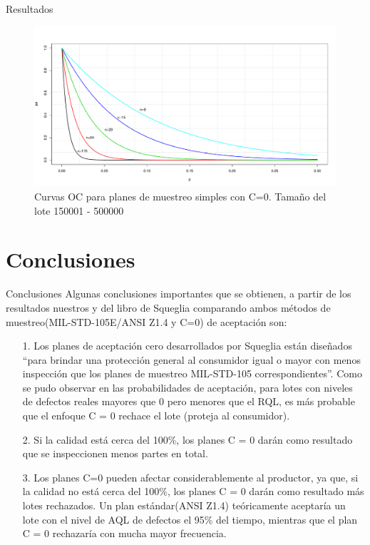\documentclass[10pt]{beamer}
\begin{document}
\begin{frame}{Resultados}
\begin{figure}[h!]
  \centering
  \includegraphics[scale=0.33]{FigurasUV/CO14.pdf}
  \caption{Curvas OC para planes de muestreo simples con C=0. Tamaño del lote 150001 - 500000}
\end{figure}
\end{frame}


\section{Conclusiones}
\begin{frame}{Conclusiones}
Algunas conclusiones importantes que se obtienen, a partir de los resultados nuestros y del libro de Squeglia comparando ambos métodos de muestreo(MIL-STD-105E/ANSI Z1.4 y C=0) de aceptación son:
\begin{itemize}
\justifying
\item[1.]Los planes de aceptación cero desarrollados por Squeglia están diseñados ``para brindar una protección general al consumidor igual o mayor con menos inspección que los planes de muestreo MIL-STD-105 correspondientes''. Como se pudo observar en las probabilidades de aceptación, para lotes con niveles de defectos reales mayores que 0 pero menores que el RQL, es más probable que el enfoque C = 0 rechace el lote (proteja al consumidor).

\item[2.]Si la calidad está cerca del 100\%, los planes C = 0 darán como resultado que se inspeccionen menos partes en total.

\item[3.]Los planes C=0 pueden afectar considerablemente al productor, ya que, si la calidad no está cerca del 100\%, los planes C = 0 darán como resultado más lotes rechazados. Un plan estándar(ANSI Z1.4) teóricamente aceptaría un lote con el nivel de AQL de defectos el 95\% del tiempo, mientras que el plan C = 0 rechazaría con mucha mayor frecuencia.
\end{itemize}
\end{frame}
\end{document}
